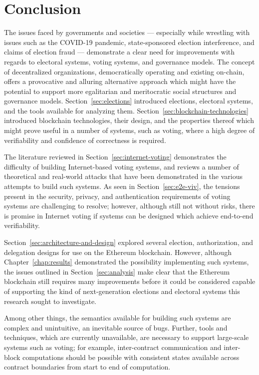 \chapter{Conclusion}\label{chap:conclusion}

The issues faced by governments and societies --- especially while wrestling
with issues such as the COVID-19 pandemic, state-sponsored election
interference, and claims of election fraud --- demonstrate a clear need for
improvements with regards to electoral systems, voting systems, and governance
models. The concept of decentralized organizations, democratically operating and
existing on-chain, offers a provocative and alluring alternative approach which
might have the potential to support more egalitarian and meritocratic social
structures and governance models. Section~\ref{sec:elections} introduced
elections, electoral systems, and the tools available for analyzing them.
Section~\ref{sec:blockchain-technologies} introduced blockchain technologies,
their design, and the properties thereof which might prove useful in a number of
systems, such as voting, where a high degree of verifiability and confidence of
correctness is required.

The literature reviewed in Section~\ref{sec:internet-voting} demonstrates the
difficulty of building Internet-based voting systems, and reviews a number of
theoretical and real-world attacks that have been demonstrated in the various
attempts to build such systems. As seen in Section~\ref{sec:e2e-viv}, the
tensions present in the security, privacy, and authentication requirements of
voting systems are challenging to resolve; however, although still not without
risks, there is promise in Internet voting if systems can be designed which
achieve end-to-end verifiability.

Section~\ref{sec:architecture-and-design} explored several election,
authorization, and delegation designs for use on the Ethereum blockchain.
However, although Chapter~\ref{chap:results} demonstrated the possibility
implementing such systems, the issues outlined in Section~\ref{sec:analysis}
make clear that the Ethereum blockchain still requires many improvements before
it could be considered capable of supporting the kind of next-generation
elections and electoral systems this research sought to investigate.

Among other things, the semantics available for building such systems are
complex and unintuitive, an inevitable source of bugs. Further, tools and
techniques, which are currently unavailable, are necessary to support
large-scale systems such as voting; for example, inter-contract communication
and inter-block computations should be possible with consistent states available
across contract boundaries from start to end of computation.

